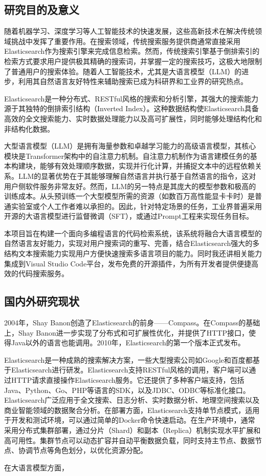 \documentclass[UTF8,a4paper,12pt]{ctexart}
\numberwithin{equation}{section}
\begin{document}
\subsection{研究目的及意义}
随着机器学习、深度学习等人工智能技术的快速发展，这些高新技术在解决传统领域挑战中发挥了重要作用。在搜索领域，传统搜索服务提供商通常直接采用Elasticsearch作为搜索引擎来完成信息检索。然而，传统搜索引擎基于倒排索引的检索方式要求用户提供极其精确的搜索词，并掌握一定的搜索技巧，这极大地限制了普通用户的搜索体验。随着人工智能技术，尤其是大语言模型（LLM）的进步，利用其自然语言友好特性来辅助搜索已成为科研界和工业界的研究热点。\par
Elasticsearch是一种分布式、RESTful风格的搜索和分析引擎，其强大的搜索能力源于其独特的倒排索引结构（Inverted Index）。这种数据结构使Elasticsearch具备高效的全文搜索能力、实时数据处理能力以及高可扩展性，同时能够处理结构化和非结构化数据。\par
大型语言模型（LLM）是拥有海量参数和卓越学习能力的高级语言模型，其核心模块是Transformer架构中的自注意力机制。自注意力机制作为语言建模任务的基本构建块，能够有效处理顺序数据，实现并行化计算，并捕捉文本中的远程依赖关系。LLM的显著优势在于其能够理解自然语言并执行基于自然语言的指令，这对用户侧软件服务非常友好。然而，LLM的另一特点是其庞大的模型参数和极高的训练成本。从头预训练一个大型模型所需的资源（如数百万高性能显卡卡时）是普通实验室或个人工作者难以承担的。因此，针对特定场景的任务，工业界普遍采用开源的大语言模型进行监督微调（SFT），或通过Prompt工程来实现任务目标。\par
本项目旨在构建一个面向多编程语言的代码检索系统，该系统将融合大语言模型的自然语言友好能力，实现对用户搜索词的重写、完善，结合Elasticsearch强大的多结构文本搜索能力实现用户方便快速搜索多语言项目的能力。同时我还讲相关能力集成到Visual Studio Code平台，发布免费的开源插件，为所有开发者提供便捷高效的代码搜索服务。


\subsection{国内外研究现状}
2004年，Shay Banon创造了Elasticsearch的前身——Compass。在Compass的基础上，Shay Banon进一步实现了分布式和可扩展性优化，并提供了HTTP接口，使得Java以外的语言也能调用。2010年，Elasticsearch的第一个版本正式发布。\par
Elasticsearch是一种成熟的搜索解决方案，一些大型搜索公司如Google和百度都基于Elasticsearch进行研发。Elasticsearch支持RESTful风格的调用，客户端可以通过HTTP请求直接操作Elasticsearch服务。它还提供了多种客户端支持，包括Java、Python、Go、PHP等语言的SDK，以及JDBC、ODBC等标准化接口。Elasticsearch广泛应用于全文搜索、日志分析、实时数据分析、地理空间搜索以及商业智能领域的数据聚合分析。在部署方面，Elasticsearch支持单节点模式，适用于开发和测试环境，可以通过简单的Docker命令快速启动。在生产环境中，通常采用分布式集群部署，通过分片（Shard）和副本（Replica）机制实现水平扩展和高可用性。集群节点可以动态扩容并自动平衡数据负载，同时支持主节点、数据节点、协调节点等角色划分，以优化资源分配。\par
在大语言模型方面，
\end{document}
